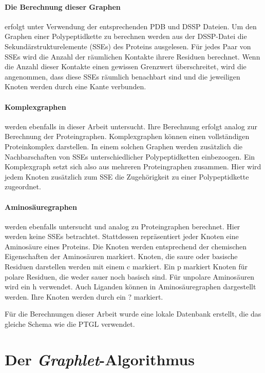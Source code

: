 \documentclass{report}
\begin{document}
\paragraph{Die Berechnung dieser Graphen}

erfolgt unter Verwendung der entsprechenden PDB und DSSP Dateien. Um den Graphen einer Polypeptidkette zu berechnen werden aus der DSSP-Datei die Sekund\"arstrukturelemente (SSEs) des Proteins ausgelesen. F\"ur jedes Paar von SSEs wird die Anzahl der r\"aumlichen Kontakte ihrere Residuen berechnet. Wenn die Anzahl dieser Kontakte einen gewissen Grenzwert \"uberschreitet, wird die angenommen, dass diese SSEs r\"aumlich benachbart sind und die jeweiligen Knoten werden durch eine Kante verbunden.

\paragraph{Komplexgraphen}

werden ebenfalls in dieser Arbeit untersucht. Ihre Berechnung erfolgt analog zur Berechnung der Proteingraphen. Komplexgraphen k\"onnen einen vollst\"andigen Proteinkomplex darstellen. In einem solchen Graphen werden zus\"atzlich die Nachbarschaften von SSEs unterschiedlicher Polypeptidketten einbezoogen. Ein Komplexgraph setzt sich also aus mehreren Proteingraphen zusammen. Hier wird jedem Knoten zus\"atzlich zum SSE die Zugeh\"origkeit zu einer Polypeptidkette zugeordnet.

\paragraph{Aminos\"auregraphen} werden ebenfalls untersucht und analog zu Proteingraphen berechnet. Hier werden keine SSEs betrachtet. Stattdessen repr\"asentiert jeder Knoten eine Aminos\"aure eines Proteins. Die Knoten werden entsprechend der chemischen Eigenschaften der Aminos\"auren markiert. Knoten, die saure oder basische Residuen darstellen werden mit einem c markiert. Ein p markiert Knoten f\"ur polare Residuen, die weder sauer noch basisch sind. F\"ur unpolare Aminos\"auren wird ein h verwendet. Auch Liganden k\"onnen in Aminos\"auregraphen dargestellt werden. Ihre Knoten werden durch ein ? markiert.


F\"ur die Berechnungen dieser Arbeit wurde eine lokale Datenbank erstellt, die das gleiche Schema wie die PTGL verwendet.

\section{Der \textit{Graphlet}-Algorithmus}
\end{document}
